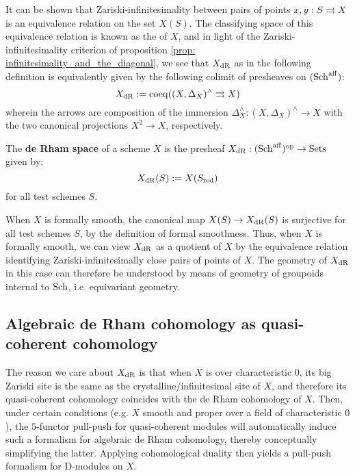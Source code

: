         It can be shown that Zariski-infinitesimality between pairs of points $x, y: S \rightrightarrows X$ is an equivalence relation on the set $X(S)$. The classifying space of this equivalence relation is known as the  of $X$, and in light of the Zariski-infinitesimality criterion of proposition \ref{prop: infinitesimality_and_the_diagonal}, we see that $X_{\mathrm{dR}}$ as in the following definition is equivalently given by the following colimit of presheaves on $(\mathrm{Sch}^{\mathrm{aff}})$:
            $$X_{\mathrm{dR}} := \operatorname{coeq}( (X, \Delta_X)^{\wedge} \rightrightarrows X )$$
        wherein the arrows are composition of the immersion $\Delta_X^{\wedge}: (X, \Delta_X)^{\wedge} \to X$ with the two canonical  projections $X^2 \to X$, respectively.
        \begin{definition} \label{def: de_rham_spaces}
            The \textbf{de Rham space} of a scheme $X$ is the presheaf $X_{\mathrm{dR}}: (\mathrm{Sch}^{\mathrm{aff}})^{\mathrm{op}} \to \mathrm{Sets}$ given by:
                $$X_{\mathrm{dR}}(S) := X(S_{\mathrm{red}})$$
            for all test schemes $S$.
        \end{definition}

        When $X$ is formally smooth, the canonical map $X(S) \to X_{\mathrm{dR}}(S)$ is surjective for all test schemes $S$, by the definition of formal smoothness. Thus, when $X$ is formally smooth, we can view $X_{\mathrm{dR}}$ as a quotient of $X$ by the equivalence relation identifying Zariski-infinitesimally close pairs of points of $X$. The geometry of $X_{\mathrm{dR}}$ in this case can therefore be understood by means of geometry of groupoids internal to $\mathrm{Sch}$, i.e. equivariant geometry.

    \subsection{Algebraic de Rham cohomology as quasi-coherent cohomology}
        The reason we care about $X_{\mathrm{dR}}$ is that when $X$ is over characteristic $0$, its big Zariski site is the same as the crystalline/infinitesimal site of $X$, and therefore its quasi-coherent cohomology coincides with the de Rham cohomology of $X$. Then, under certain conditions (e.g. $X$ smooth and proper over a field of characteristic $0$), the $5$-functor pull-push for quasi-coherent modules will automatically induce such a formalism for algebraic de Rham cohomology, thereby conceptually simplifying the latter. Applying cohomological duality then yields a pull-push formalism for D-modules on $X$.